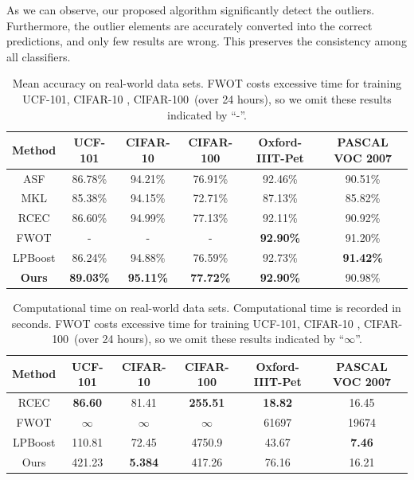 \documentclass[10pt,twocolumn,letterpaper]{article}
\begin{document}
As we can observe, our proposed algorithm significantly detect the outliers.
Furthermore, the outlier elements are accurately converted into the correct predictions, and only few results are wrong.
This preserves the consistency among all classifiers.


\begin{table}[t]
\centering
\begin{tabular}{|c|c|c|c|c|c|}
\hline
Method              & UCF-101          & CIFAR-10         & CIFAR-100        & Oxford-IIIT-Pet  & PASCAL VOC 2007    \\\hline
ASF                 & 86.78\%          & 94.21\%          & 76.91\%          & 92.46\%          &   90.51\%          \\
MKL                 & 85.38\%          & 94.15\%          & 72.71\%          & 87.13\%          &   85.82\%          \\
RCEC                & 86.60\%          & 94.99\%          & 77.13\%          & 92.11\%          &   90.92\%          \\
FWOT                & -                & -                & -                & \textbf{92.90\%} &   91.20\%          \\
LPBoost             & 86.24\%          & 94.88\%          & 76.59\%          & 92.73\%          &   \textbf{91.42\%} \\\hline
\textbf{Ours}       & \textbf{89.03\%} & \textbf{95.11\%} & \textbf{77.72\%} & \textbf{92.90\%} &   90.98\%          \\
\hline
\end{tabular}
\caption{Mean accuracy on real-world data sets.
FWOT costs excessive time for training UCF-101, CIFAR-10 , CIFAR-100~(over 24 hours),
so we omit these results indicated by ``-''.
}
\label{table:total_acc}
\end{table}


\begin{table}[t]
\centering
\begin{tabular}{|c|c|c|c|c|c|}
\hline
Method              & UCF-101         & CIFAR-10        & CIFAR-100        & Oxford-IIIT-Pet & PASCAL VOC 2007 \\\hline
RCEC                & \textbf{86.60}  & 81.41           &  \textbf{255.51} & \textbf{18.82}  &   16.45         \\
FWOT                & $\infty$        & $\infty$        &  $\infty$        & 61697           &   19674         \\
LPBoost             & 110.81          & 72.45           &  4750.9          & 43.67           &   \textbf{7.46} \\\hline
Ours                & 421.23          & \textbf{5.384}  &  417.26          & 76.16           &   16.21         \\
\hline
\end{tabular}
\caption{Computational time on real-world data sets. Computational time is recorded in seconds.
FWOT costs excessive time for training UCF-101, CIFAR-10 , CIFAR-100~(over 24 hours),
so we omit these results indicated by ``$\infty$''.}
\label{table:total_time}
\end{table}
\end{document}
